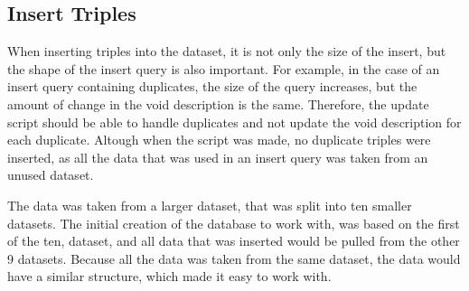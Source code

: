 

\subsection{Insert Triples}\label{sec:insert-triples}
When inserting triples into the dataset, it is not only the size of the insert, but the shape of the insert query is also important. For example, in the case of an insert query containing duplicates, the size of the query increases, but the amount of change in the \gls{void} description is the same. Therefore, the update script should be able to handle duplicates and not update the \gls{void} description for each duplicate. Altough when the script was made, no duplicate triples were inserted, as all the data that was used in an insert query was taken from an unused dataset.


The data was taken from a larger dataset, that was split into ten smaller datasets. The initial creation of the database to work with, was based on the first of the ten, dataset, and all data that was inserted would be pulled from the other 9 datasets. Because all the data was taken from the same dataset, the data would have a similar structure, which made it easy to work with.



